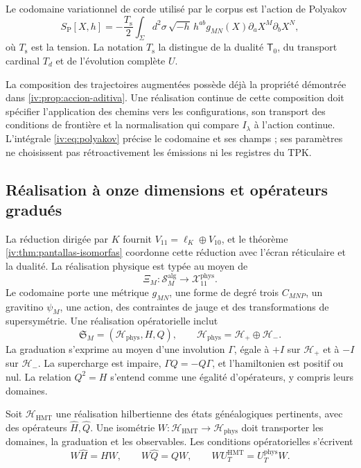 Le codomaine variationnel de corde utilisé par le corpus
est l’action de Polyakov
\begin{equation}
 S_{\mathrm P}[X,h]
 =-\frac{T_{\mathrm s}}2\int_\Sigma d^2\sigma\,
 \sqrt{-h}\,h^{ab}g_{MN}(X)
             \partial_aX^M\partial_bX^N,
 \label{iv:eq:polyakov}
\end{equation}
où \(T_{\mathrm s}\) est la tension. La notation
\(T_{\mathrm s}\) la distingue de la dualité
\(\mathsf T_0\), du transport cardinal \(T_d\)
et de l’évolution complète \(U\).

La composition des trajectoires augmentées possède déjà la
propriété démontrée dans \ref{iv:prop:accion-aditiva}.
Une réalisation continue de cette composition doit
spécifier l’application des chemins vers les configurations,
son transport des conditions de frontière et la
normalisation qui compare \(I_\lambda\) à l’action
continue. L’intégrale \eqref{iv:eq:polyakov} précise
le codomaine et ses champs ; ses paramètres ne choisissent pas
rétroactivement les émissions ni les registres du TPK.

\subsection{Réalisation à onze dimensions et opérateurs gradués}

La réduction dirigée par \(K\) fournit
\(V_{11}=\ell_K\oplus V_{10}\), et le théorème
\ref{iv:thm:pantallas-isomorfas} coordonne cette réduction
avec l’écran réticulaire et la dualité. La réalisation
physique est typée au moyen de
\[
 \Xi_M:\mathscr S_M^{\mathrm{alg}}
                  \longrightarrow\mathcal X_{11}^{\mathrm{phys}}.
\]
Le codomaine porte une métrique \(g_{MN}\), une forme de degré trois
\(C_{MNP}\), un gravitino \(\psi_M\), une action,
des contraintes de jauge et des transformations de
supersymétrie. Une réalisation opératorielle inclut
\[
 \mathfrak S_M=(\mathcal H_{\mathrm{phys}},H,Q),\qquad
 \mathcal H_{\mathrm{phys}}=\mathcal H_+\oplus\mathcal H_-.
\]
La graduation s’exprime au moyen d’une involution
\(\Gamma\), égale à \(+I\) sur \(\mathcal H_+\)
et à \(-I\) sur \(\mathcal H_-\). La supercharge
est impaire, \(\Gamma Q=-Q\Gamma\), et
l’hamiltonien est positif ou nul. La relation
\(Q^2=H\) s’entend comme une égalité d’opérateurs,
y compris leurs domaines.


Soit \(\mathcal H_{\mathrm{HMT}}\) une réalisation
hilbertienne des états généalogiques pertinents,
avec des opérateurs \(\widehat H,\widehat Q\). Une
isométrie \(W:\mathcal H_{\mathrm{HMT}}\to
\mathcal H_{\mathrm{phys}}\) doit transporter
les domaines, la graduation et les observables. Les conditions
opératorielles s’écrivent
\begin{equation}
 W\widehat H=HW,\qquad
 W\widehat Q=QW,\qquad
 WU_T^{\mathrm{HMT}}=U_T^{\mathrm{phys}}W.
 \label{iv:eq:entrelazamiento-fisico}
\end{equation}

